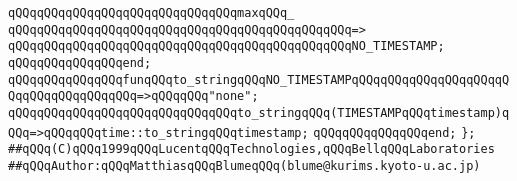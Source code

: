 \verb|qQQqqQQqqQQqqQQqqQQqqQQqqQQqqQQqmaxqQQq_|\newline
\verb|qQQqqQQqqQQqqQQqqQQqqQQqqQQqqQQqqQQqqQQqqQQqqQQq=>|\newline
\verb|qQQqqQQqqQQqqQQqqQQqqQQqqQQqqQQqqQQqqQQqqQQqqQQqNO_TIMESTAMP;|\newline
\verb|qQQqqQQqqQQqqQQqend;|\newline
\newline
\newline
\verb|qQQqqQQqqQQqqQQqfunqQQqto_stringqQQqNO_TIMESTAMPqQQqqQQqqQQqqQQqqQQqqQQqqQQqqQQqqQQqqQQq=>qQQqqQQq"none";|\newline
\verb|qQQqqQQqqQQqqQQqqQQqqQQqqQQqqQQqto_stringqQQq(TIMESTAMPqQQqtimestamp)qQQq=>qQQqqQQqtime::to_stringqQQqtimestamp;|\newline
\verb|qQQqqQQqqQQqqQQqend;|\newline
\newline
\verb|};|\newline
\newline
\newline
\verb|##qQQq(C)qQQq1999qQQqLucentqQQqTechnologies,qQQqBellqQQqLaboratories|\newline
\verb|##qQQqAuthor:qQQqMatthiasqQQqBlumeqQQq(blume@kurims.kyoto-u.ac.jp)|\newline

